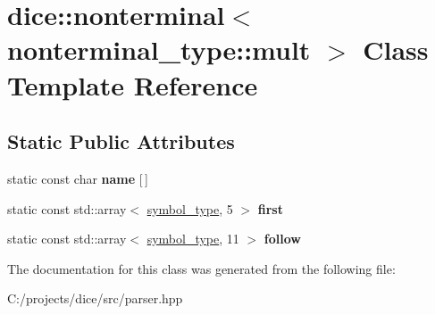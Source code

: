 \hypertarget{classdice_1_1nonterminal_3_01nonterminal__type_1_1mult_01_4}{}\section{dice\+:\+:nonterminal$<$ nonterminal\+\_\+type\+:\+:mult $>$ Class Template Reference}
\label{classdice_1_1nonterminal_3_01nonterminal__type_1_1mult_01_4}
\subsection*{Static Public Attributes}
\begin{DoxyCompactItemize}
\item 
\mbox{\label{classdice_1_1nonterminal_3_01nonterminal__type_1_1mult_01_4_a0cad6f35671701ccd566b4a704d57ff8}} 
static const char {\bfseries name} \mbox{[}$\,$\mbox{]}
\item 
\mbox{\label{classdice_1_1nonterminal_3_01nonterminal__type_1_1mult_01_4_a0aad0ceeb53c4b94ba8e819a30596539}} 
static const std\+::array$<$ \mbox{\hyperlink{symbols_8hpp_ab0295a855bb7eadc138abd6993af3aea}{symbol\+\_\+type}}, 5 $>$ {\bfseries first}
\item 
\mbox{\label{classdice_1_1nonterminal_3_01nonterminal__type_1_1mult_01_4_a21b3828061f359b340f16d494c83f790}} 
static const std\+::array$<$ \mbox{\hyperlink{symbols_8hpp_ab0295a855bb7eadc138abd6993af3aea}{symbol\+\_\+type}}, 11 $>$ {\bfseries follow}
\end{DoxyCompactItemize}


The documentation for this class was generated from the following file\+:\begin{DoxyCompactItemize}
\item 
C\+:/projects/dice/src/parser.\+hpp\end{DoxyCompactItemize}
